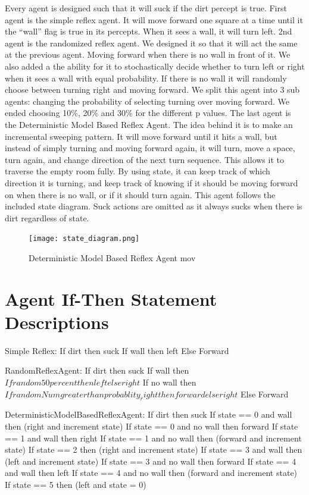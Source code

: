 \documentclass{article} %
\begin{document}
Every agent is designed such that it will suck if the dirt percept is true.
First agent is the simple reflex agent. It will move forward one square at a time until it the “wall” flag is true in its percepts. When it sees a wall, it will turn left.
2nd agent is the randomized reflex agent. We designed it so that it will act the same at the previous agent. Moving forward when there is no wall in front of it. We also added a the ability for it to stochastically decide whether to turn left or right when it sees a wall with equal probability. If there is no wall it will randomly choose between turning right and moving forward. We split this agent into 3 sub agents: changing the probability of selecting turning over moving forward. We ended choosing 10\%, 20\% and 30\% for the different p values.
The last agent is the Deterministic Model Based Reflex Agent. The idea behind it is to make an incremental sweeping pattern. It will move forward until it hits a wall, but instead of simply turning and moving forward again, it will turn, move a space, turn again, and change direction of the next turn sequence. This allows it to traverse the empty room fully. By using state, it can keep track of which direction it is turning, and keep track of knowing if it should be moving forward on when there is no wall, or if it should turn again. This agent follows the included state diagram. Suck actions are omitted as it always sucks when there is dirt regardless of state.
\begin{figure}[h]
\begin{center}
    \texttt{[image: state\_diagram.png]}
\end{center}
\caption{Deterministic Model Based Reflex Agent mov}
\end{figure}

\section{Agent If-Then Statement Descriptions}
Simple Reflex: 
If dirt then suck
If wall then left
Else Forward

RandomReflexAgent:
If dirt then suck
If wall then \(If random50percent then left else right\)
If no wall then \(If randomNum greater than probablity_right then forward else right\)
Else Forward

DeterministicModelBasedReflexAgent:
If dirt then suck
If state == 0 and wall then (right and increment state) 
If state == 0 and no wall then forward
If state == 1 and wall then right 
If state == 1 and no wall then (forward and increment state)
If state == 2 then (right and increment state)
If state == 3 and wall then (left and increment state)
If state == 3 and no wall then forward
If state == 4 and wall then left 
If state == 4 and no wall then (forward and increment state)
If state == 5 then (left and state = 0)
\end{document}

